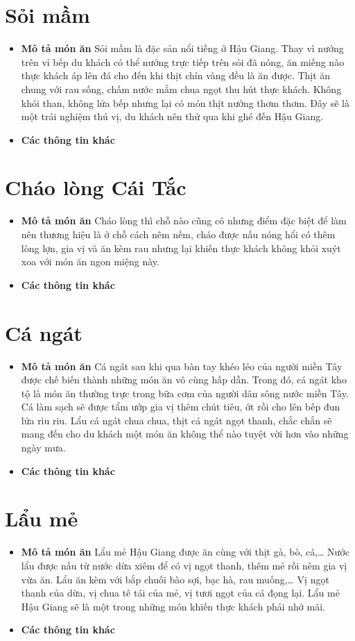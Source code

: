 \documentclass{article}
\begin{document}
\section{Sỏi mầm}
\begin{itemize}
    \item{\textbf{Mô tả món ăn}} Sỏi mầm là đặc sản nổi tiếng ở Hậu Giang. Thay vì nướng trên vỉ bếp du khách có thể nướng trực tiếp trên sỏi đã nóng, ăn miếng nào thực khách áp lên đá cho đến khi thịt chín vàng đều là ăn được. Thịt ăn chung với rau sống, chấm nước mắm chua ngọt thu hút thực khách. Không khói than, không lửa bếp nhưng lại có món thịt nướng thơm thơm. Đây sẽ là một trải nghiệm thú vị, du khách nên thử qua khi ghé đến Hậu Giang.
    \item{\textbf{Các thông tin khác}}
\end{itemize}

\section{Cháo lòng Cái Tắc}
\begin{itemize}
    \item{\textbf{Mô tả món ăn}} Cháo lòng thì chỗ nào cũng có nhưng điểm đặc biệt để làm nên thương hiệu là ở chỗ cách nêm nếm, cháo được nấu nóng hổi có thêm lòng lợn, gia vị và ăn kèm rau nhưng lại khiến thực khách không khỏi xuýt xoa với món ăn ngon miệng này.
    \item{\textbf{Các thông tin khác}}
\end{itemize}

\section{Cá ngát}
\begin{itemize}
    \item{\textbf{Mô tả món ăn}} Cá ngát sau khi qua bàn tay khéo léo của người miền Tây được chế biến thành những món ăn vô cùng hấp dẫn. Trong đó, cá ngát kho tộ là món ăn thường trực trong bữa cơm của người dân sông nước miền Tây. Cá làm sạch sẽ được tẩm ướp gia vị thêm chút tiêu, ớt rồi cho lên bếp đun lửa riu riu. Lẩu cá ngát chua chua, thịt cá ngát ngọt thanh, chắc chắn sẽ mang đến cho du khách một món ăn không thể nào tuyệt vời hơn vào những ngày mưa.
    \item{\textbf{Các thông tin khác}}
\end{itemize}

\section{Lẩu mẻ}
\begin{itemize}
    \item{\textbf{Mô tả món ăn}} Lẩu mẻ Hậu Giang được ăn cùng với thịt gà, bò, cá,… Nước lẩu được nấu từ nước dừa xiêm để có vị ngọt thanh, thêm mẻ rồi nêm gia vị vừa ăn. Lẩu ăn kèm với bắp chuối bào sợi, bạc hà, rau muống,… Vị ngọt thanh của dừa, vị chua tê tái của mẻ, vị tươi ngọt của cá đọng lại. Lẩu mẻ Hậu Giang sẽ là một trong những món khiến thực khách phải nhớ mãi.
    \item{\textbf{Các thông tin khác}}
\end{itemize}
\end{document}

